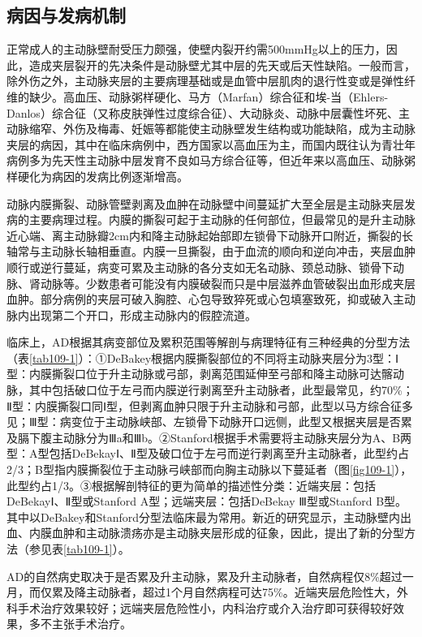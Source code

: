 \subsection{病因与发病机制}

正常成人的主动脉壁耐受压力颇强，使壁内裂开约需500mmHg以上的压力，因此，造成夹层裂开的先决条件是动脉壁尤其中层的先天或后天性缺陷。一般而言，除外伤之外，主动脉夹层的主要病理基础或是血管中层肌肉的退行性变或是弹性纤维的缺少。高血压、动脉粥样硬化、马方（Marfan）综合征和埃-当（Ehlers-Danlos）综合征（又称皮肤弹性过度综合征）、大动脉炎、动脉中层囊性坏死、主动脉缩窄、外伤及梅毒、妊娠等都能使主动脉壁发生结构或功能缺陷，成为主动脉夹层的病因，其中在临床病例中，西方国家以高血压为主，而国内既往认为青壮年病例多为先天性主动脉中层发育不良如马方综合征等，但近年来以高血压、动脉粥样硬化为病因的发病比例逐渐增高。

动脉内膜撕裂、动脉管壁剥离及血肿在动脉壁中间蔓延扩大至全层是主动脉夹层发病的主要病理过程。内膜的撕裂可起于主动脉的任何部位，但最常见的是升主动脉近心端、离主动脉瓣2cm内和降主动脉起始部即左锁骨下动脉开口附近，撕裂的长轴常与主动脉长轴相垂直。内膜一旦撕裂，由于血流的顺向和逆向冲击，夹层血肿顺行或逆行蔓延，病变可累及主动脉的各分支如无名动脉、颈总动脉、锁骨下动脉、肾动脉等。少数患者可能没有内膜破裂而只是中层滋养血管破裂出血形成夹层血肿。部分病例的夹层可破入胸腔、心包导致猝死或心包填塞致死，抑或破入主动脉内出现第二个开口，形成主动脉内的假腔流道。

临床上，AD根据其病变部位及累积范围等解剖与病理特征有三种经典的分型方法（表\ref{tab109-1}）：①DeBakey根据内膜撕裂部位的不同将主动脉夹层分为3型：Ⅰ型：内膜撕裂口位于升主动脉或弓部，剥离范围延伸至弓部和降主动脉可达髂动脉，其中包括破口位于左弓而内膜逆行剥离至升主动脉者，此型最常见，约70\%；Ⅱ型：内膜撕裂口同Ⅰ型，但剥离血肿只限于升主动脉和弓部，此型以马方综合征多见；Ⅲ型：病变位于主动脉峡部、左锁骨下动脉开口远侧，此型又根据夹层是否累及膈下腹主动脉分为Ⅲa和Ⅲb。②Stanford根据手术需要将主动脉夹层分为A、B两型：A型包括DeBekayⅠ、Ⅱ型及破口位于左弓而逆行剥离至升主动脉者，此型约占2/3；B型指内膜撕裂位于主动脉弓峡部而向胸主动脉以下蔓延者（图\ref{fig109-1}），此型约占1/3。③根据解剖特征的更为简单的描述性分类：近端夹层：包括DeBekayⅠ、Ⅱ型或Stanford
A型；远端夹层：包括DeBekay Ⅲ型或Stanford
B型。其中以DeBakey和Stanford分型法临床最为常用。新近的研究显示，主动脉壁内出血、内膜血肿和主动脉溃疡亦是主动脉夹层形成的征象，因此，提出了新的分型方法（参见表\ref{tab109-1}）。

AD的自然病史取决于是否累及升主动脉，累及升主动脉者，自然病程仅8\%超过一月，而仅累及降主动脉者，超过1个月自然病程可达75\%。近端夹层危险性大，外科手术治疗效果较好；远端夹层危险性小，内科治疗或介入治疗即可获得较好效果，多不主张手术治疗。

